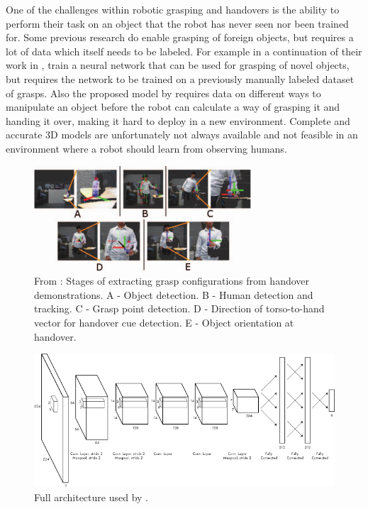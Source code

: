 One of the challenges within robotic grasping and handovers is the ability to perform their task on an object that the robot has never seen nor been trained for. Some previous research do enable grasping of foreign objects, but requires a lot of data which itself needs to be labeled. For example \textcite{Huebner2008a} in a continuation of their work in \parencite{Huebner2008}, train a neural network that can be used for grasping of novel objects, but requires the network to be trained on a previously manually labeled dataset of grasps. Also the proposed model by \parencite{Chan2014} requires data on different ways to manipulate an object before the robot can calculate a way of grasping it and handing it over, making it hard to deploy in a new environment. Complete and accurate 3D models are unfortunately not always available and not feasible in an environment where a robot should learn from observing humans.

\begin{figure}
	\centering
	\includegraphics[width=\textwidth]{img/related-work/demonstrations.png}
	\caption{From \parencite{Chan2015a}: Stages of extracting grasp configurations from handover demonstrations. A - Object detection. B - Human detection and tracking. C - Grasp point detection. D - Direction of torso-to-hand vector for handover cue detection. E - Object orientation at handover.}
\end{figure}

\begin{figure}
	\centering
	\includegraphics[width=\textwidth]{img/related-work/cnn-architecture.png}
	\caption{Full architecture used by \textcite{Redmon2014}.}
	\label{fig:rel__cnn-arch}
\end{figure}

